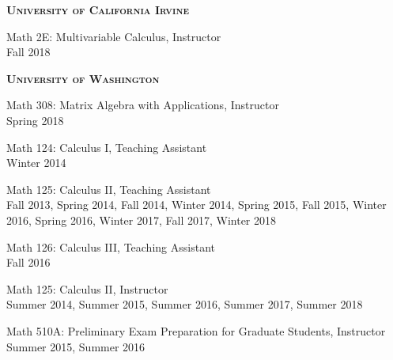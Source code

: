 \documentclass[12pt]{article}
\newenvironment{date_section}
	{
	\vspace{-1ex}
	\leftmargini = 15ex
		\begin{itemize}[
			labelsep = *,
			labelwidth = 9ex,
			labelindent = 0ex,
			itemindent = !,
			font=\normalfont,
			align=parleft
		]{}
		\itemsep=-1.5mm
	}
	{\end{itemize}\vspace{-2ex}}
\newcommand{\yearmo}[2]{
	\item[
		{\makebox[1ex][r]{#1}}
		\hspace{1ex}
		{\makebox[1ex][l]{#2} }
		] }
\begin{document}
	\begin{date_section}

		\yearmo{}{}\textbf{\textsc{University of California Irvine}}

		\yearmo{}{} Math 2E: Multivariable Calculus, Instructor
		\\
		Fall 2018

		\yearmo{}{}\textbf{\textsc{University of Washington}}

		\yearmo{}{} Math 308: Matrix Algebra with Applications, Instructor
		\\
		Spring 2018

		\yearmo{}{} Math 124: Calculus I, Teaching Assistant
		\\
		Winter 2014

		\yearmo{}{} Math 125: Calculus II, Teaching Assistant
		\\
		Fall 2013, Spring 2014, Fall 2014, Winter 2014, Spring 2015, Fall 2015, Winter 2016, Spring 2016, Winter 2017, Fall 2017, Winter 2018

		\yearmo{}{} Math 126: Calculus III, Teaching Assistant
		\\
		Fall 2016

		\yearmo{}{} Math 125: Calculus II, Instructor
		\\
		Summer 2014, Summer 2015, Summer 2016, Summer 2017, Summer 2018

		\yearmo{}{} Math 510A: Preliminary Exam Preparation for Graduate Students, Instructor
		\\
		Summer 2015, Summer 2016




\end{date_section}
\end{document}

